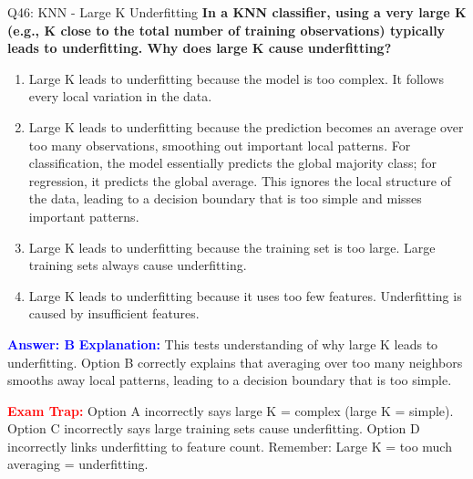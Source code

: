 \documentclass[8pt]{beamer}
\begin{document}
	\begin{frame}{Q46: KNN - Large K Underfitting}
		\fontsize{6.5}{7.5}\selectfont
		\textbf{In a KNN classifier, using a very large K (e.g., K close to the total number of training observations) typically leads to underfitting. Why does large K cause underfitting?}
		
		\begin{enumerate}
			\item Large K leads to underfitting because the model is too complex. It follows every local variation in the data.
			\item Large K leads to underfitting because the prediction becomes an average over too many observations, smoothing out important local patterns. For classification, the model essentially predicts the global majority class; for regression, it predicts the global average. This ignores the local structure of the data, leading to a decision boundary that is too simple and misses important patterns.
			\item Large K leads to underfitting because the training set is too large. Large training sets always cause underfitting.
			\item Large K leads to underfitting because it uses too few features. Underfitting is caused by insufficient features.
		\end{enumerate}
		
		\vspace{0.1cm}
		\textcolor{blue}{\textbf{Answer: B}}
		\vspace{0.1cm}
		\textcolor{blue}{\textbf{Explanation:}} This tests understanding of why large K leads to underfitting. Option B correctly explains that averaging over too many neighbors smooths away local patterns, leading to a decision boundary that is too simple.
		
		\textcolor{red}{\textbf{Exam Trap:}} Option A incorrectly says large K = complex (large K = simple). Option C incorrectly says large training sets cause underfitting. Option D incorrectly links underfitting to feature count. Remember: Large K = too much averaging = underfitting.
	\end{frame}
	
\end{document}
